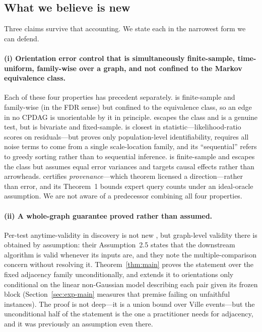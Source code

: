 \subsection{What we believe is new}\label{sec:new}

Three claims survive that accounting. We state each in the narrowest form we
can defend.

\paragraph{(i) Orientation error control that is simultaneously
finite-sample, time-uniform, family-wise over a graph, and not confined to the
Markov equivalence class.} Each of these four properties has precedent
separately. \citet{strobl2019estimating} is finite-sample and family-wise (in
the FDR sense) but confined to the equivalence class, so an edge in no
CPDAG is unorientable by it in principle. \citet{shimizu2008use} escapes
the class and is a genuine test, but is bivariate and fixed-sample.
\citet{ruiz2022sequentially} is closest in statistic---likelihood-ratio scores
on residuals---but proves only population-level identifiability, requires all
noise terms to come from a single scale-location family, and its
``sequential'' refers to greedy sorting rather than to sequential inference.
\citet{strieder2023confidence} is finite-sample and escapes the class but
assumes equal error variances and targets causal effects rather than
arrowheads. \citet{uehara2026iterative} certifies \emph{provenance}---which
theorem licensed a direction---rather than error, and its Theorem~1 bounds
expert query counts under an ideal-oracle assumption. We are not aware of a
predecessor combining all four properties.

\paragraph{(ii) A whole-graph guarantee proved rather than assumed.}
Per-test anytime-validity in discovery is not new
\citep{csillag2025prediction}, but graph-level validity there is obtained by
assumption: their Assumption~2.5 states that the downstream algorithm is valid
whenever its inputs are, and they note the multiple-comparison concern without
resolving it. Theorem~\ref{thm:main} proves the statement over the fixed
adjacency family unconditionally, and extends it to orientations only
conditional on the linear non-Gaussian model describing each pair given its
frozen block (Section~\ref{sec:exp-main} measures that premise failing on
unfaithful instances). The proof is not deep---it is a union bound over Ville
events---but the unconditional half of the statement is the one a
practitioner needs for adjacency, and it was previously an assumption even
there.

